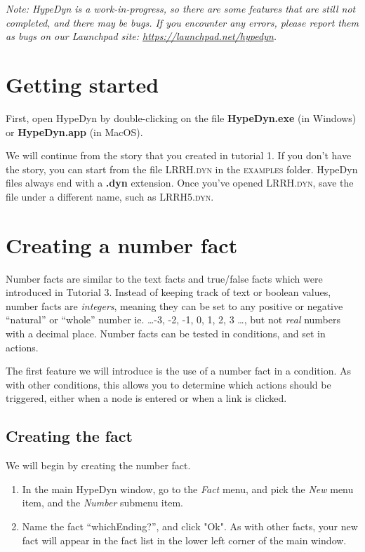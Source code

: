 \documentclass{article}
\begin{document}
\textit{Note:  HypeDyn is a work-in-progress, so there are some features that are still
not completed, and there may be bugs. If you encounter any errors, please
report them as bugs on our Launchpad site: \url{https://launchpad.net/hypedyn}.}

\section{Getting started}

First, open HypeDyn by double-clicking on the file \textbf{HypeDyn.exe} (in
Windows) or \textbf{HypeDyn.app} (in MacOS).

We will continue from the story that you created in tutorial 1. If you don't
have the story, you can start from the file \textsc{LRRH.dyn} in the
\textsc{examples} folder. HypeDyn files always end with a \textbf{.dyn} extension.
Once you've opened \textsc{LRRH.dyn}, save the file under a different 
name, such as \textsc{LRRH5.dyn}.

\section{Creating a number fact}

Number facts are similar to the text facts and true/false facts which 
were introduced in Tutorial 3. Instead of keeping track of text or 
boolean values, number facts are \textit{integers}, meaning they can be set 
to any positive or negative ``natural'' or ``whole'' number ie. \dots -3, 
-2, -1, 0, 1, 2, 3 \dots, but not \textit{real} numbers with a 
decimal place. Number facts can be tested in conditions, and set in 
actions.

The first feature we will introduce is the use of a number fact in a condition.
As with other conditions, this allows you to determine which actions should be
triggered, either when a node is entered or when a link is clicked.

\subsection{Creating the fact}

We will begin by creating the number fact.

\begin{enumerate}
  \item In the main HypeDyn window, go to the \textit{Fact} menu, and 
  pick the \textit{New} menu item, and the \textit{Number} submenu item. 
  \item Name the fact ``whichEnding?'', and click "Ok". As with other 
  facts, your new fact will appear in the fact list in the lower left 
  corner of the main window.  
\end{enumerate}
\end{document}
